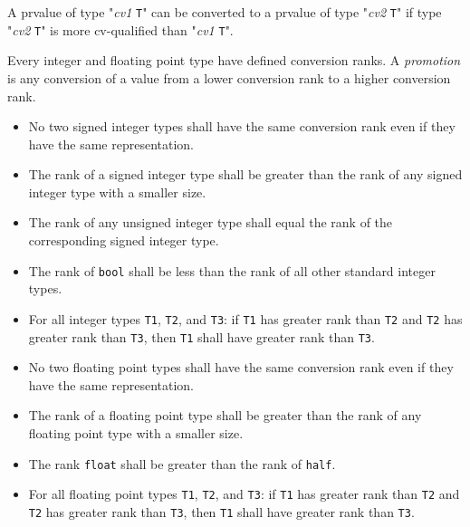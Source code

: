 
A prvalue of type "\textit{cv1} \texttt{T}" can be converted to a prvalue of type
"\textit{cv2} \texttt{T}" if type "\textit{cv2} \texttt{T}" is more cv-qualified
than "\textit{cv1} \texttt{T}".


\p Every integer and floating point type have defined conversion ranks.
A \textit{promotion} is any conversion of a value from a lower conversion rank
to a higher conversion rank.


\begin{itemize}
  \item  No two signed integer types shall have the same conversion rank even if
  they have the same representation.
  \item The rank of a signed integer type shall be greater than the rank of any
  signed integer type with a smaller size.
  \item The rank of any unsigned integer type shall equal the rank of the
  corresponding signed integer type.
  \item The rank of \texttt{bool} shall be less than the rank of all other
  standard integer types.
  \item For all integer types \texttt{T1}, \texttt{T2}, and \texttt{T3}: if
  \texttt{T1} has greater rank than \texttt{T2} and \texttt{T2} has greater rank
  than \texttt{T3}, then \texttt{T1} shall have greater rank than \texttt{T3}.
\end{itemize}


\begin{itemize}
  \item No two floating point types shall have the same conversion rank even if
  they have the same representation.
  \item The rank of a floating point type shall be greater than the rank of any
  floating point type with a smaller size.
  \item The rank \texttt{float} shall be greater than the rank of \texttt{half}.
  \item For all floating point types \texttt{T1}, \texttt{T2}, and \texttt{T3}:
  if \texttt{T1} has greater rank than \texttt{T2} and \texttt{T2} has greater
  rank than \texttt{T3}, then \texttt{T1} shall have greater rank than
  \texttt{T3}.
\end{itemize}

